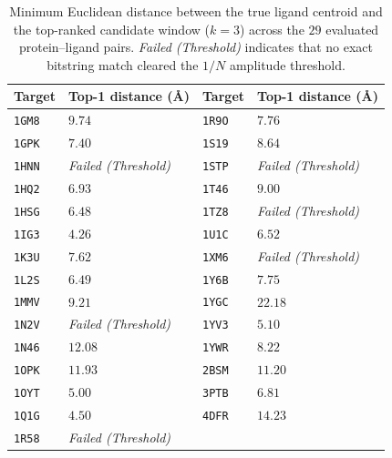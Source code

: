 \begin{table}[htbp]
\centering
\caption{Minimum Euclidean distance between the true ligand centroid and the top-ranked
candidate window ($k=3$) across the $29$ evaluated protein--ligand pairs.
\emph{Failed (Threshold)} indicates that no exact bitstring match cleared the $1/N$
amplitude threshold.}
\label{tab:distances}
\begin{tabular}{llll}
\toprule
\textbf{Target} & \textbf{Top-1 distance (\AA)} & \textbf{Target} & \textbf{Top-1 distance (\AA)} \\
\midrule
\texttt{1GM8} & $9.74$  & \texttt{1R9O} & $7.76$ \\
\texttt{1GPK} & $7.40$  & \texttt{1S19} & $8.64$ \\
\texttt{1HNN} & \emph{Failed (Threshold)} & \texttt{1STP} & \emph{Failed (Threshold)} \\
\texttt{1HQ2} & $6.93$  & \texttt{1T46} & $9.00$ \\
\texttt{1HSG} & $6.48$  & \texttt{1TZ8} & \emph{Failed (Threshold)} \\
\texttt{1IG3} & $4.26$  & \texttt{1U1C} & $6.52$ \\
\texttt{1K3U} & $7.62$  & \texttt{1XM6} & \emph{Failed (Threshold)} \\
\texttt{1L2S} & $6.49$  & \texttt{1Y6B} & $7.75$ \\
\texttt{1MMV} & $9.21$  & \texttt{1YGC} & $22.18$ \\
\texttt{1N2V} & \emph{Failed (Threshold)} & \texttt{1YV3} & $5.10$ \\
\texttt{1N46} & $12.08$ & \texttt{1YWR} & $8.22$ \\
\texttt{1OPK} & $11.93$ & \texttt{2BSM} & $11.20$ \\
\texttt{1OYT} & $5.00$  & \texttt{3PTB} & $6.81$ \\
\texttt{1Q1G} & $4.50$  & \texttt{4DFR} & $14.23$ \\
\texttt{1R58} & \emph{Failed (Threshold)} & & \\
\bottomrule
\end{tabular}
\end{table}

